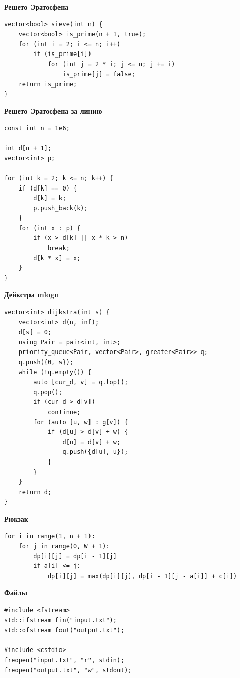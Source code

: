 \documentclass[a4paper, 10pt]{article}
\begin{document}
{\Large \textbf{Решето Эратосфена}}
\begin{lstlisting}
vector<bool> sieve(int n) {
    vector<bool> is_prime(n + 1, true);
    for (int i = 2; i <= n; i++)
        if (is_prime[i])
            for (int j = 2 * i; j <= n; j += i)
                is_prime[j] = false;
    return is_prime;            
}
\end{lstlisting}

{\Large \textbf{Решето Эратосфена за линию}}
\begin{lstlisting}
const int n = 1e6;

int d[n + 1];
vector<int> p;
 
for (int k = 2; k <= n; k++) {
    if (d[k] == 0) {
        d[k] = k;
        p.push_back(k);
    }
    for (int x : p) {
        if (x > d[k] || x * k > n)
            break;
        d[k * x] = x;
    }
}
\end{lstlisting}

{\Large \textbf{Дейкстра mlogn}}
\begin{lstlisting}
vector<int> dijkstra(int s) {
    vector<int> d(n, inf);
    d[s] = 0;
    using Pair = pair<int, int>;
    priority_queue<Pair, vector<Pair>, greater<Pair>> q;
    q.push({0, s});
    while (!q.empty()) {
        auto [cur_d, v] = q.top();
        q.pop();
        if (cur_d > d[v])
            continue;
        for (auto [u, w] : g[v]) {
            if (d[u] > d[v] + w) {
                d[u] = d[v] + w;
                q.push({d[u], u});
            }
        }
    }
    return d;
}
\end{lstlisting}

{\Large \textbf{Рюкзак}}
\begin{lstlisting}
for i in range(1, n + 1):
    for j in range(0, W + 1):
        dp[i][j] = dp[i - 1][j]
        if a[i] <= j:
            dp[i][j] = max(dp[i][j], dp[i - 1][j - a[i]] + c[i])
\end{lstlisting}

{\Large \textbf{Файлы}}
\begin{lstlisting}
#include <fstream>
std::ifstream fin("input.txt"); 
std::ofstream fout("output.txt");

#include <cstdio>
freopen("input.txt", "r", stdin);
freopen("output.txt", "w", stdout);
\end{lstlisting}
\end{document}
